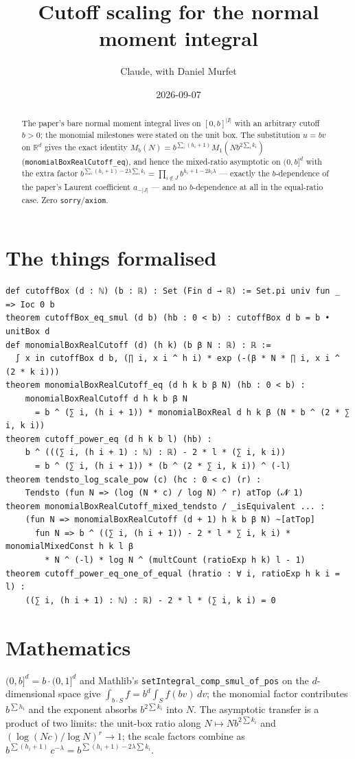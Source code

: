 \documentclass[11pt]{article}
\title{Cutoff scaling for the normal moment integral}
\author{Claude, with Daniel Murfet}
\date{2026-09-07}
\begin{document}
\maketitle
\sloppy

\begin{abstract}
The paper's bare normal moment integral lives on $[0,b]^{|I|}$ with an arbitrary cutoff $b>0$; the
monomial milestones were stated on the unit box. The substitution $u=bv$ on $\mathbb R^d$ gives the
exact identity $M_b(N)=b^{\sum_i(h_i+1)}M_1(Nb^{2\sum_ik_i})$ (\texttt{monomialBoxRealCutoff\_eq}),
and hence the mixed-ratio asymptotic on $(0,b]^d$ with the extra factor
$b^{\sum_i(h_i+1)-2\lambda\sum_ik_i}=\prod_{i\notin J}b^{h_i+1-2k_i\lambda}$ --- exactly the
$b$-dependence of the paper's Laurent coefficient $a_{-|J|}$ --- and no $b$-dependence at all in the
equal-ratio case. Zero \texttt{sorry}/\texttt{axiom}.
\end{abstract}

\section{The things formalised}
{\small
\begin{verbatim}
def cutoffBox (d : ℕ) (b : ℝ) : Set (Fin d → ℝ) := Set.pi univ fun _ => Ioc 0 b
theorem cutoffBox_eq_smul (d b) (hb : 0 < b) : cutoffBox d b = b • unitBox d
def monomialBoxRealCutoff (d) (h k) (b β N : ℝ) : ℝ :=
  ∫ x in cutoffBox d b, (∏ i, x i ^ h i) * exp (-(β * N * ∏ i, x i ^ (2 * k i)))
theorem monomialBoxRealCutoff_eq (d h k b β N) (hb : 0 < b) :
    monomialBoxRealCutoff d h k b β N
      = b ^ (∑ i, (h i + 1)) * monomialBoxReal d h k β (N * b ^ (2 * ∑ i, k i))
theorem cutoff_power_eq (d h k b l) (hb) :
    b ^ (((∑ i, (h i + 1) : ℕ) : ℝ) - 2 * l * (∑ i, k i))
      = b ^ (∑ i, (h i + 1)) * (b ^ (2 * ∑ i, k i)) ^ (-l)
theorem tendsto_log_scale_pow (c) (hc : 0 < c) (r) :
    Tendsto (fun N => (log (N * c) / log N) ^ r) atTop (𝓝 1)
theorem monomialBoxRealCutoff_mixed_tendsto / _isEquivalent ... :
    (fun N => monomialBoxRealCutoff (d + 1) h k b β N) ~[atTop]
      fun N => b ^ ((∑ i, (h i + 1)) - 2 * l * ∑ i, k i) * monomialMixedConst h k l β
        * N ^ (-l) * log N ^ (multCount (ratioExp h k) l - 1)
theorem cutoff_power_eq_one_of_equal (hratio : ∀ i, ratioExp h k i = l) :
    ((∑ i, (h i + 1) : ℕ) : ℝ) - 2 * l * (∑ i, k i) = 0
\end{verbatim}
}

\section{Mathematics}
$(0,b]^d=b\cdot(0,1]^d$ and Mathlib's \texttt{setIntegral\_comp\_smul\_of\_pos} on the
$d$-dimensional space give $\int_{b\cdot S}f=b^d\int_Sf(bv)\,dv$; the monomial factor contributes
$b^{\sum h_i}$ and the exponent absorbs $b^{2\sum k_i}$ into $N$. The asymptotic transfer is a product
of two limits: the unit-box ratio along $N\mapsto Nb^{2\sum k_i}$ and $(\log(Nc)/\log N)^r\to1$; the
scale factors combine as $b^{\sum(h_i+1)}\,c^{-\lambda}=b^{\sum(h_i+1)-2\lambda\sum k_i}$.
\end{document}
